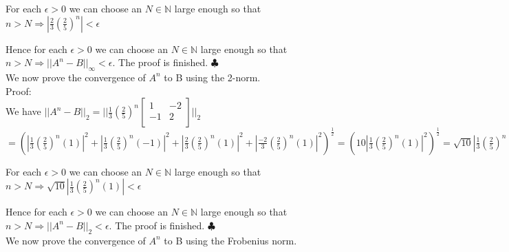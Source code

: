 \documentclass[12pt]{article}
\newenvironment{problems}{\begin{list}{}{\setlength{\labelwidth}{.7in}}}{\end{list}}
\begin{document}
\begin{problems}
 For each $\epsilon >0$ we can choose an $N\in \mathbb{N}$ large enough so that $n > N \Rightarrow |\frac{2}{3}(\frac{2}{5})^n| <\epsilon$ 
 
 Hence for each  $\epsilon >0$ we can choose an $N\in \mathbb{N}$ large enough so that $n > N \Rightarrow ||A^n-B||_{\infty} <\epsilon$. The proof is finished.  \hfill $\clubsuit$\\

We now prove the convergence of $A^n$ to B using the 2-norm.\\
Proof:\\

We have  $||A^n-B||_{2} = || 
  \frac{1}{3}(\frac{2}{5})^n
  \begin{bmatrix}
   1 &  -2 \\
   -1 &  2\\
  \end{bmatrix}    ||_{2} $\\
  
  $= ( |\frac{1}{3}(\frac{2}{5})^n(1)|^2 +  |\frac{1}{3}(\frac{2}{5})^n(-1)|^2 + |\frac{2}{3}(\frac{2}{5})^n(1)|^2 + |\frac{-2}{3}(\frac{2}{5})^n(1)|^2                               )^{\frac{1}{2}} = (10|\frac{1}{3}(\frac{2}{5})^n(1)|^2)^{\frac{1}{2}} =\sqrt{10}|\frac{1}{3}(\frac{2}{5})^n(1)| $

 For each $\epsilon >0$ we can choose an $N\in \mathbb{N}$ large enough so that $n > N \Rightarrow \sqrt{10}|\frac{1}{3}(\frac{2}{5})^n(1)| <\epsilon$ 
 
 Hence for each  $\epsilon >0$ we can choose an $N\in \mathbb{N}$ large enough so that $n > N \Rightarrow ||A^n-B||_{2} <\epsilon$. The proof is finished.  \hfill $\clubsuit$\\

 We now prove the convergence of $A^n$ to B using the Frobenius norm.\\
 

\end{problems}
\end{document}
